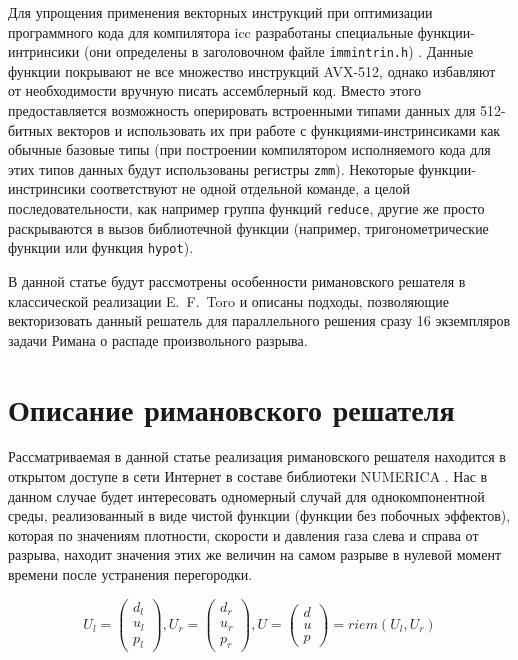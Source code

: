 \documentclass[utf8]{psta}
\begin{document}
Для упрощения применения векторных инструкций при оптимизации программного кода для компилятора icc разработаны специальные функции-интринсики (они определены в заголовочном файле \texttt{immintrin.h}) \cite{IntelIntrGuide}.
Данные функции покрывают не все множество инструкций AVX-512, однако избавляют от необходимости вручную писать ассемблерный код.
Вместо этого предоставляется возможность оперировать встроенными типами данных для 512-битных векторов и использовать их при работе с функциями-инстринсиками как обычные базовые типы (при построении компилятором исполняемого кода для этих типов данных будут использованы регистры \texttt{zmm}).
Некоторые функции-инстринсики соответствуют не одной отдельной команде, а целой последовательности, как например группа функций \texttt{reduce}, другие же просто раскрываются в вызов библиотечной функции (например, тригонометрические функции или функция \texttt{hypot}).

В данной статье будут рассмотрены особенности римановского решателя в классической реализации E.~F.~Toro \cite{TorRiemann} и описаны подходы, позволяющие векторизовать данный решатель для параллельного решения сразу 16 экземпляров задачи Римана о распаде произвольного разрыва.

\section{Описание римановского решателя}

Рассматриваемая в данной статье реализация римановского решателя находится в открытом доступе в сети Интернет в составе библиотеки NUMERICA \cite{Numerica}.
Нас в данном случае будет интересовать одномерный случай для однокомпонентной среды, реализованный в виде чистой функции (функции без побочных эффектов), которая по значениям плотности, скорости и давления газа слева и справа от разрыва, находит значения этих же величин на самом разрыве в нулевой момент времени после устранения перегородки.

\begin{equation}\label{eq:riemann}
U_l = \left( \begin{array}{ccc} d_l \\ u_l \\ p_l \end{array} \right),
U_r = \left( \begin{array}{ccc} d_r \\ u_r \\ p_r \end{array} \right),
U = \left( \begin{array}{ccc} d \\ u \\ p \end{array} \right) = riem(U_l, U_r)
\end{equation}
\end{document}
